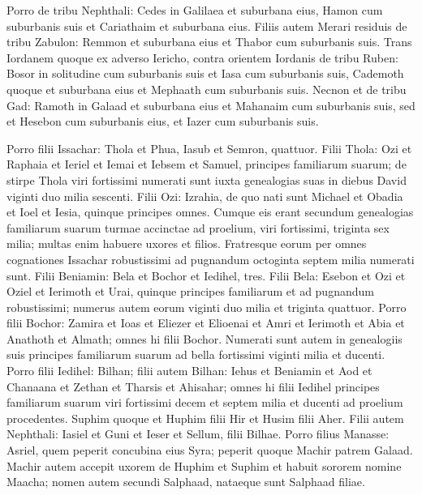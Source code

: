 \begin{biblechapter}
\verse Porro de tribu Nephthali: Cedes in Galilaea et suburbana eius, Hamon cum suburbanis suis et Cariathaim et suburbana eius. 
\verse Filiis autem Merari residuis de tribu Zabulon: Remmon et suburbana eius et Thabor cum suburbanis suis. 
\verse Trans Iordanem quoque ex adverso Iericho, contra orientem Iordanis de tribu Ruben: Bosor in solitudine cum suburbanis suis et Iasa cum suburbanis suis, 
\verse Cademoth quoque et suburbana eius et Mephaath cum suburbanis suis. 
\verse Necnon et de tribu Gad: Ramoth in Galaad et suburbana eius et Mahanaim cum suburbanis suis, 
\verse sed et Hesebon cum suburbanis eius, et Iazer cum suburbanis suis. 
\end{biblechapter}

\begin{biblechapter}  
\verse Porro filii Issachar: Thola et Phua, Iasub et Semron, quattuor. 
\verse Filii Thola: Ozi et Raphaia et Ieriel et Iemai et Iebsem et Samuel, principes familiarum suarum; de stirpe Thola viri fortissimi numerati sunt iuxta genealogias suas in diebus David viginti duo milia sescenti. 
\verse Filii Ozi: Izrahia, de quo nati sunt Michael et Obadia et Ioel et Iesia, quinque principes omnes. 
\verse Cumque eis erant secundum genealogias familiarum suarum turmae accinctae ad proelium, viri fortissimi, triginta sex milia; multas enim habuere uxores et filios. 
\verse Fratresque eorum per omnes cognationes Issachar robustissimi ad pugnandum octoginta septem milia numerati sunt. 
\verse Filii Beniamin: Bela et Bochor et Iedihel, tres. 
\verse Filii Bela: Esebon et Ozi et Oziel et Ierimoth et Urai, quinque principes familiarum et ad pugnandum robustissimi; numerus autem eorum viginti duo milia et triginta quattuor. 
\verse Porro filii Bochor: Zamira et Ioas et Eliezer et Elioenai et Amri et Ierimoth et Abia et Anathoth et Almath; omnes hi filii Bochor. 
\verse Numerati sunt autem in genealogiis suis principes familiarum suarum ad bella fortissimi viginti milia et ducenti. 
\verse Porro filii Iedihel: Bilhan; filii autem Bilhan: Iehus et Beniamin et Aod et Chanaana et Zethan et Tharsis et Ahisahar; 
\verse omnes hi filii Iedihel principes familiarum suarum viri fortissimi decem et septem milia et ducenti ad proelium procedentes. 
\verse Suphim quoque et Huphim filii Hir et Husim filii Aher. 
\verse Filii autem Nephthali: Iasiel et Guni et Ieser et Sellum, filii Bilhae. 
\verse Porro filius Manasse: Asriel, quem peperit concubina eius Syra; peperit quoque Machir patrem Galaad. 
\verse Machir autem accepit uxorem de Huphim et Suphim et habuit sororem nomine Maacha; nomen autem secundi Salphaad, nataeque sunt Salphaad filiae. 

\end{biblechapter}
